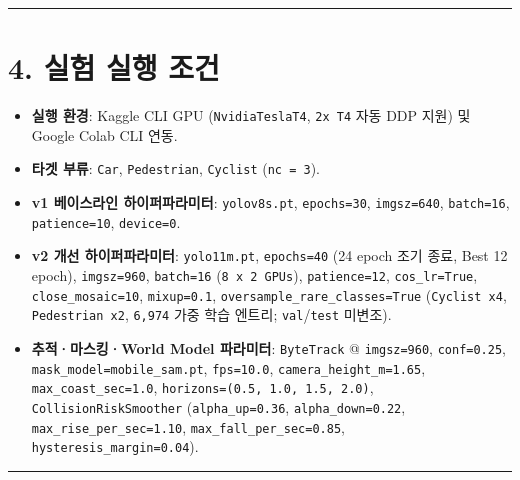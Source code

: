 \documentclass[10.5pt,a4paper]{article}
\begin{document}
\par\noindent\rule{\textwidth}{0.4pt}\par\medskip

\section{4. 실험 실행 조건}

\begin{itemize}[leftmargin=1.5em,itemsep=2pt]
\item \textbf{실행 환경}: Kaggle CLI GPU (\texttt{NvidiaTeslaT4}, \texttt{2x T4} 자동 DDP 지원) 및 Google Colab CLI 연동.
\item \textbf{타겟 부류}: \texttt{Car}, \texttt{Pedestrian}, \texttt{Cyclist} (\texttt{nc = 3}).
\item \textbf{v1 베이스라인 하이퍼파라미터}: \texttt{yolov8s.\allowbreak{}pt}, \texttt{epochs=30}, \texttt{imgsz=640}, \texttt{batch=16}, \texttt{patience=10}, \texttt{device=0}.
\item \textbf{v2 개선 하이퍼파라미터}: \texttt{yolo11m.\allowbreak{}pt}, \texttt{epochs=40} (24 epoch 조기 종료, Best 12 epoch), \texttt{imgsz=960}, \texttt{batch=16} (\texttt{8 x 2 GPUs}), \texttt{patience=12}, \texttt{cos\_\allowbreak{}lr=True}, \texttt{close\_\allowbreak{}mosaic=10}, \texttt{mixup=0.\allowbreak{}1}, \texttt{oversample\_\allowbreak{}rare\_\allowbreak{}classes=True} (\texttt{Cyclist x4}, \texttt{Pedestrian x2}, \texttt{6,\allowbreak{}974} 가중 학습 엔트리; \texttt{val}/\texttt{test} 미변조).
\item \textbf{추적·마스킹·World Model 파라미터}: \texttt{ByteTrack} @ \texttt{imgsz=960}, \texttt{conf=0.\allowbreak{}25}, \texttt{mask\_\allowbreak{}model=mobile\_\allowbreak{}sam.\allowbreak{}pt}, \texttt{fps=10.\allowbreak{}0}, \texttt{camera\_\allowbreak{}height\_\allowbreak{}m=1.\allowbreak{}65}, \texttt{max\_\allowbreak{}coast\_\allowbreak{}sec=1.\allowbreak{}0}, \texttt{horizons=(0.\allowbreak{}5,\allowbreak{} 1.\allowbreak{}0,\allowbreak{} 1.\allowbreak{}5,\allowbreak{} 2.\allowbreak{}0)}, \texttt{CollisionRiskSmoother} (\texttt{alpha\_\allowbreak{}up=0.\allowbreak{}36}, \texttt{alpha\_\allowbreak{}down=0.\allowbreak{}22}, \texttt{max\_\allowbreak{}rise\_\allowbreak{}per\_\allowbreak{}sec=1.\allowbreak{}10}, \texttt{max\_\allowbreak{}fall\_\allowbreak{}per\_\allowbreak{}sec=0.\allowbreak{}85}, \texttt{hysteresis\_\allowbreak{}margin=0.\allowbreak{}04}).
\end{itemize}

\par\noindent\rule{\textwidth}{0.4pt}\par\medskip
\end{document}
